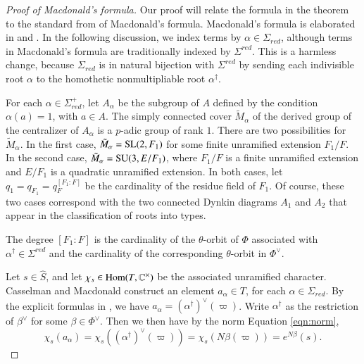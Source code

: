 \begin{proof}[Proof of Macdonald's formula]
Our proof will relate the formula in the theorem to the standard from of Macdonald's formula.
Macdonald's formula is elaborated 
in \cite{casselman1980unramified} and \cite{casselman2005companion}.
In the following discussion, we index terms by $\alpha\in\Sigma_{red}$, although terms in Macdonald's 
formula are traditionally indexed by $\Sigma^{red}$.  This is a harmless change, because $\Sigma_{red}$ is
in natural bijection with $\Sigma^{red}$ by sending each indivisible root $\alpha$ 
to the homothetic nonmultipliable root $\alpha^\dag$.

For each $\alpha\in \Sigma^+_{red}$, 
let $A_{\alpha}$ be the subgroup of $A$ defined by the condition $\alpha(a)=1$, with $a\in A$.
The simply connected cover $\tilde M_\alpha$ of the derived group of the centralizer of $A_\alpha$ is a $p$-adic
group of rank $1$.  There are two possibilities for $\tilde M_\alpha$.  In the first case, $\tilde M_\alpha = {\operatorname{SL}}(2,F_1)$ for
some finite unramified extension $F_1/F$.  In the second case, $\tilde M_\alpha = {\operatorname{SU}}(3,E/F_1)$, where $F_1/F$ is 
a finite unramified extension and $E/F_1$ is a quadratic unramified extension.  In both cases, 
let $q_1 = q_{F_1} = q_F^{[F_1:F]}$ be the cardinality
of the residue field of $F_1$.  
Of course, these two cases correspond with the two connected Dynkin diagrams $A_1$ and $A_2$
that appear in the classification of roots into types.

The degree $[F_1:F]$ is the cardinality of the $\theta$-orbit of $\Phi$ associated with $\alpha^\dag\in \Sigma^{red}$
and the cardinality of the corresponding $\theta$-orbit in $\Phi^\vee$.


Let $s\in \hat S$, and let $\chi_s\in{\operatorname{Hom}}(T,\mathbb{C}^\times)$ be the associated
unramified character.  
Casselman and Macdonald construct an element $a_{\alpha}\in T$, for each $\alpha\in\Sigma_{red}$.
By the explicit formulas in \cite{casselman2005companion}, 
we have $a_\alpha = (\alpha^\dag)^\vee(\varpi)$.
Write $\alpha^\dag$ as the restriction of $\beta^\vee$ for some $\beta\in\Phi^\vee$. Then
we then have by the norm Equation \ref{eqn:norm},
\[
\chi_s(a_{\alpha}) = \chi_s((\alpha^\dag)^\vee(\varpi)) = \chi_s(N\beta(\varpi)) = e^{N\beta}(s).
\]


\end{proof}
